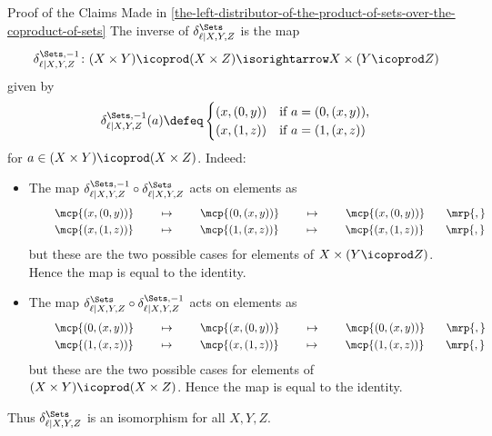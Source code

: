 \begin{Proof}{Proof of the Claims Made in \cref{the-left-distributor-of-the-product-of-sets-over-the-coproduct-of-sets}}%
    The inverse of $\delta^{\Sets}_{\ell|X,Y,Z}$ is the map
    \[
        \delta^{\Sets,-1}_{\ell|X,Y,Z}%
        \colon%
        (X\times Y)\icoprod(X\times Z)
        \isorightarrow
        X\times(Y\icoprod Z)
    \]%
    given by
    \[%
        \delta^{\Sets,-1}_{\ell|X,Y,Z}(a)%
        \defeq%
        \begin{cases}
            (x,(0,y)) &\text{if $a=(0,(x,y))$,}\\
            (x,(1,z)) &\text{if $a=(1,(x,z))$}\
        \end{cases}%
    \]%
    for $a\in(X\times Y)\icoprod(X\times Z)$. Indeed:
    \begin{itemize}
        \item{}The map $\delta^{\Sets,-1}_{\ell|X,Y,Z} \circ \delta^{\Sets}_{\ell|X,Y,Z}$ acts on elements as
           \begin{align*}
               &\mkern40mu\mcp{(x,(0,y))}\mkern40mu \mapsto \mkern40mu\mcp{(0,(x,y))}    \mkern40mu \mapsto \mkern40mu\mcp{(x,(0,y))}\mkern35mu\mrp{,}\\
               &\mkern40mu\mcp{(x,(1,z))}\mkern40mu \mapsto \mkern40mu\mcp{(1,(x,z))}\mkern40mu \mapsto \mkern40mu\mcp{(x,(1,z))}\mkern35mu\mrp{,}
           \end{align*}
           but these are the two possible cases for elements of $X \times (Y \icoprod Z)$. Hence the map is equal to the identity.
        \item\SloganFont{Invertibility \rmII. }The map $\delta^{\Sets}_{\ell|X,Y,Z} \circ \delta^{\Sets,-1}_{\ell|X,Y,Z}$ acts on elements as
            \begin{align*}
                &\mkern40mu\mcp{(0,(x,y))}\mkern40mu \mapsto \mkern40mu\mcp{(x,(0,y))}    \mkern40mu \mapsto \mkern40mu\mcp{(0,(x,y))}\mkern35mu\mrp{,}\\
                &\mkern40mu\mcp{(1,(x,z))}\mkern40mu \mapsto \mkern40mu\mcp{(x,(1,z))}\mkern40mu \mapsto \mkern40mu\mcp{(1,(x,z))}\mkern35mu\mrp{,}
            \end{align*}
            but these are the two possible cases for elements of $(X \times Y) \icoprod (X \times Z)$. Hence the map is equal to the identity.
    \end{itemize}
    Thus $\delta^{\Sets}_{\ell|X,Y,Z}$ is an isomorphism for all $X,Y,Z$.


\end{Proof}
